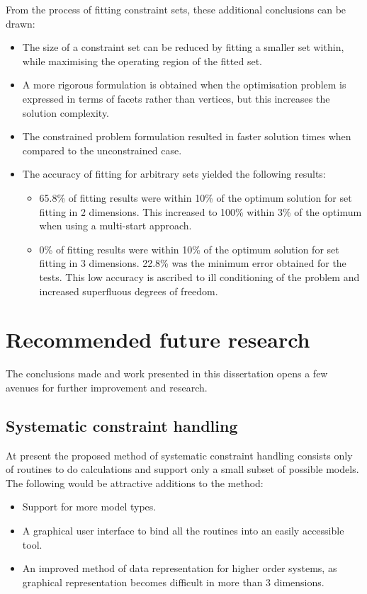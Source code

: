 From the process of fitting constraint sets, these additional conclusions can be drawn:
\begin{itemize}
\item The size of a constraint set can be reduced by fitting a smaller set within, while maximising the operating region of the fitted set.
\item A more rigorous formulation is obtained when the optimisation problem is expressed in terms of facets rather than vertices, but this increases the solution complexity.
\item The constrained problem formulation resulted in faster solution times when compared to the unconstrained case.
\item The accuracy of fitting for arbitrary sets yielded the following results:
  \begin{itemize}
  \item 65.8\% of fitting results were within 10\% of the optimum solution for set fitting in 2 dimensions.
  This increased to 100\% within 3\% of the optimum when using a multi-start approach.
  \item 0\% of fitting results were within 10\% of the optimum solution for set fitting in 3 dimensions.
  22.8\% was the minimum error obtained for the tests.
  This low accuracy is ascribed to ill conditioning of the problem and increased superfluous degrees of freedom.
  \end{itemize}
\end{itemize}

\section{Recommended future research}
The conclusions made and work presented in this dissertation opens a few avenues for further improvement and research.
\subsection{Systematic constraint handling}
At present the proposed method of systematic constraint handling consists only of routines to do calculations and support only a small subset of possible models.
The following would be attractive additions to the method:
\begin{itemize}
  \item Support for more model types.
  \item A graphical user interface to bind all the routines into an easily accessible tool.
  \item An improved method of data representation for higher order systems, as graphical representation becomes difficult in more than 3 dimensions. 
\end{itemize}
